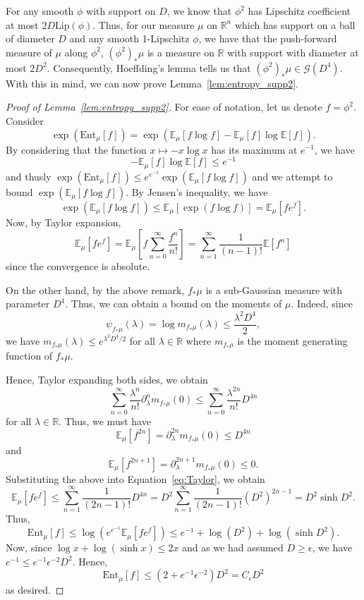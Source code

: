 For any smooth \(\phi\) with support on \(D\), we know that \(\phi^2\) has Lipschitz coefficient 
at most \(2D \text{Lip}(\phi)\). Thus, for our measure \(\mu\) on \(\mathbb{R}^n\) which has support on a ball of diameter \(D\) 
and any smooth 1-Lipschitz \(\phi\), we have that the push-forward measure of \(\mu\) along \(\phi^2\), 
\((\phi^2)_* \mu\) is a measure on \(\mathbb{R}\) with support 
with diameter at most \(2D^2\). Consequently, Hoeffding's lemma tells us that \((\phi^2)_* \mu \in \mathcal{G}(D^4)\).  
With this in mind, we can now prove Lemma~\ref{lem:entropy_supp2}.

\begin{proof}[Proof of Lemma~\ref{lem:entropy_supp2}]
  For ease of notation, let us denote \(f = \phi^2\). Consider 
  \[\exp(\text{Ent}_\mu[f]) = \exp(\mathbb{E}_\mu[f\log f] - \mathbb{E}_\mu[f]\log\mathbb{E}[f]).\]
  By considering that the function \(x \mapsto -x\log x\) has its maximum at \(e^{-1}\), we have
  \[- \mathbb{E}_\mu[f]\log\mathbb{E}[f] \le e^{-1}\]
  and thusly \(\exp(\text{Ent}_\mu[f]) \le e^{e^{-1}}\exp(\mathbb{E}_\mu[f\log f])\) and 
  we attempt to bound \(\exp(\mathbb{E}_\mu[f\log f])\). By Jensen's inequality, we have 
  \[\exp(\mathbb{E}_\mu[f\log f]) \le \mathbb{E}_\mu[\exp(f\log f)] = \mathbb{E}_\mu[f e^f].\]
  Now, by Taylor expansion,
  \begin{equation}\label{eq:Taylor}
    \mathbb{E}_\mu[f e^f] = \mathbb{E}_\mu\left[f \sum_{n = 0}^\infty \frac{f^n}{n!}\right]
      = \sum_{n = 1}^\infty \frac{1}{(n - 1)!} \mathbb{E}[f^n]
  \end{equation}
  since the convergence is absolute. 

  On the other hand, by the above remark, \(f_* \mu\) is a sub-Gaussian measure with parameter \(D^4\).
  Thus, we can obtain a bound on the moments of \(\mu\). Indeed, since
  \[\psi_{f_*\mu}(\lambda) = \log m_{f_*\mu}(\lambda) \le \frac{\lambda^2 D^4}{2},\]
  we have \(m_{f_*\mu}(\lambda) \le e^{\lambda^2 D^4 / 2}\) for all \(\lambda \in \mathbb{R}\)
  where \(m_{f_*\mu}\) is the moment generating function of \(f_* \mu\).  

  Hence, Taylor expanding both sides, we obtain
  \[\sum_{n = 0}^\infty \frac{\lambda^n}{n!}\partial_\lambda^n m_{f_*\mu}(0) \le \sum_{n = 0}^\infty \frac{\lambda^{2n}}{n!}D^{4n}\]
  for all \(\lambda \in \mathbb{R}\). Thus, we must have 
  \[\mathbb{E}_\mu[f^{2n}] = \partial_\lambda^{2n} m_{f_*\mu}(0) \le D^{4n}\]
  and 
  \[\mathbb{E}_\mu[f^{2n + 1}] = \partial_\lambda^{2n + 1} m_{f_*\mu}(0) \le 0.\]
  Substituting the above into Equation~\eqref{eq:Taylor}, we obtain
  \[\mathbb{E}_\mu[fe^f] \le \sum_{n = 1}^\infty \frac{1}{(2n - 1)!}D^{4n}
      = D^2 \sum_{n = 1}^\infty \frac{1}{(2n - 1)!}(D^2)^{2n - 1}
      = D^2 \sinh D^2.\]
  Thus, 
  \[\text{Ent}_\mu[f] \le \log(e^{e^{-1}}\mathbb{E}_\mu[fe^f])
    \le e^{-1} + \log(D^2) + \log (\sinh D^2).\]
  Now, since \(\log x + \log (\sinh x) \le 2x\) and as we had assumed \(D \ge \epsilon\), we have 
  \(e^{-1} \le e^{-1}\epsilon^{-2} D^2\). Hence,
  \[\text{Ent}_\mu[f] \le (2 + e^{-1}\epsilon^{-2})D^2 = C_\epsilon D^2\]
  as desired.
\end{proof}

